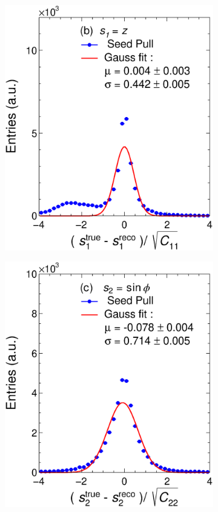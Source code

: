 \begin{figure}[t]
\begin{subfigure}{0.32\textwidth}
         \includegraphics[width=\textwidth]{figures/ch5-KF_NDGAr/FullSample/Int/Units/Unit1Seed.eps}
         \caption{}
         \label{fig:resp1SeedGAr_Int}
     \end{subfigure}
    \begin{subfigure}{0.32\textwidth}
         \centering
         \includegraphics[width=\textwidth]{figures/ch5-KF_NDGAr/FullSample/Int/Units/Unit2Seed.eps}

\end{subfigure}
\end{figure}
